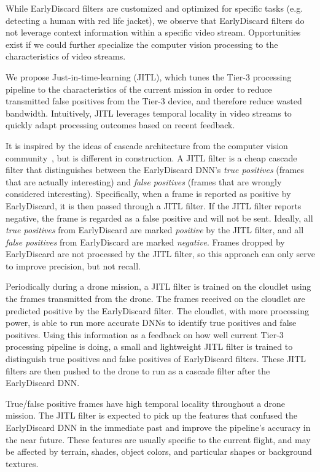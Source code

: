 While EarlyDiscard filters are customized and optimized for specific tasks (e.g.
detecting a human with red life jacket), we observe that EarlyDiscard filters do
not leverage context information within a specific video stream. Opportunities
exist if we could further specialize the computer vision processing to the
characteristics of video streams.

We propose Just-in-time-learning  (JITL), which tunes the Tier-3 processing
pipeline to the characteristics of the current mission in order to reduce
transmitted false positives from the Tier-3 device, and therefore reduce wasted
bandwidth.  Intuitively, JITL leverages temporal locality in video streams to
quickly adapt processing outcomes based on recent feedback. 

It is inspired by the ideas of cascade architecture from the computer vision
community~\cite{Viola2001}, but is different in construction. A JITL filter is a
cheap cascade filter that distinguishes between the EarlyDiscard DNN's
\emph{true positives} (frames that are actually interesting) and \emph{false
positives} (frames that are wrongly considered interesting). Specifically, when
a frame is reported as positive by EarlyDiscard, it is then passed through a
JITL filter. If the JITL filter reports negative, the frame is regarded as a
false positive and will not be sent. Ideally, all \emph{true positives} from
EarlyDiscard are marked \emph{positive} by the JITL filter, and all \emph{false
positives} from EarlyDiscard are marked \emph{negative}.  Frames dropped by
EarlyDiscard are not processed by the JITL filter, so this approach can only
serve to improve precision, but not recall.


Periodically during a drone mission, a JITL filter is trained on the cloudlet
using the frames transmitted from the drone.  The frames received on the
cloudlet are predicted positive by the EarlyDiscard filter. The cloudlet, with
more processing power, is able to run more accurate DNNs to identify true
positives and false positives. Using this information as a feedback on how well
current Tier-3 processing pipeline is doing, a small and lightweight JITL filter
is trained to distinguish true positives and false positives of EarlyDiscard
filters. These JITL filters are then pushed to the drone to run as a cascade
filter after the EarlyDiscard DNN.

True/false positive frames have high temporal locality throughout a drone
mission. The JITL filter is expected to pick up the features that confused the
EarlyDiscard DNN in the immediate past and improve the pipeline's accuracy in
the near future. These features are usually specific to the current flight, and
may be affected by terrain, shades, object colors, and particular shapes or
background textures.

